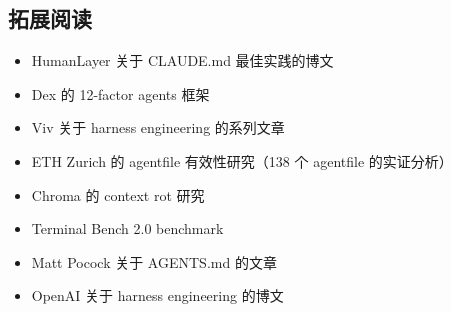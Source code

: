 \subsection{拓展阅读}

\begin{itemize}[leftmargin=1.5em]
    \item HumanLayer 关于 CLAUDE.md 最佳实践的博文
    \item Dex 的 12-factor agents 框架
    \item Viv 关于 harness engineering 的系列文章
    \item ETH Zurich 的 agentfile 有效性研究（138 个 agentfile 的实证分析）
    \item Chroma 的 context rot 研究
    \item Terminal Bench 2.0 benchmark
    \item Matt Pocock 关于 AGENTS.md 的文章
    \item OpenAI 关于 harness engineering 的博文
\end{itemize}



